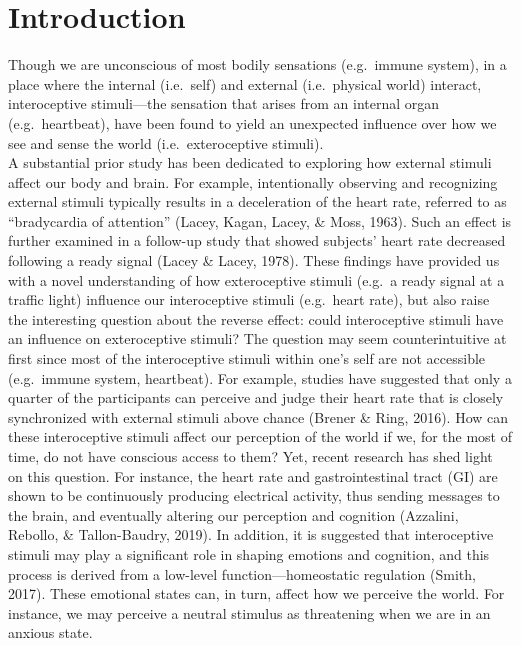 \documentclass[
  man]{apa6}
\begin{document}
\hypertarget{introduction}{%
\section{Introduction}\label{introduction}}

Though we are unconscious of most bodily sensations (e.g.~immune system), in a place where the internal (i.e.~self) and external (i.e.~physical world) interact, interoceptive stimuli---the sensation that arises from an internal organ (e.g.~heartbeat), have been found to yield an unexpected influence over how we see and sense the world (i.e.~exteroceptive stimuli).\\
A substantial prior study has been dedicated to exploring how external stimuli affect our body and brain. For example, intentionally observing and recognizing external stimuli typically results in a deceleration of the heart rate, referred to as ``bradycardia of attention'' (Lacey, Kagan, Lacey, \& Moss, 1963). Such an effect is further examined in a follow-up study that showed subjects' heart rate decreased following a ready signal (Lacey \& Lacey, 1978). These findings have provided us with a novel understanding of how exteroceptive stimuli (e.g.~a ready signal at a traffic light) influence our interoceptive stimuli (e.g.~heart rate), but also raise the interesting question about the reverse effect: could interoceptive stimuli have an influence on exteroceptive stimuli? The question may seem counterintuitive at first since most of the interoceptive stimuli within one's self are not accessible (e.g.~immune system, heartbeat). For example, studies have suggested that only a quarter of the participants can perceive and judge their heart rate that is closely synchronized with external stimuli above chance (Brener \& Ring, 2016). How can these interoceptive stimuli affect our perception of the world if we, for the most of time, do not have conscious access to them? Yet, recent research has shed light on this question.
For instance, the heart rate and gastrointestinal tract (GI) are shown to be continuously producing electrical activity, thus sending messages to the brain, and eventually altering our perception and cognition (Azzalini, Rebollo, \& Tallon-Baudry, 2019). In addition, it is suggested that interoceptive stimuli may play a significant role in shaping emotions and cognition, and this process is derived from a low-level function---homeostatic regulation (Smith, 2017). These emotional states can, in turn, affect how we perceive the world. For instance, we may perceive a neutral stimulus as threatening when we are in an anxious state.
\end{document}
